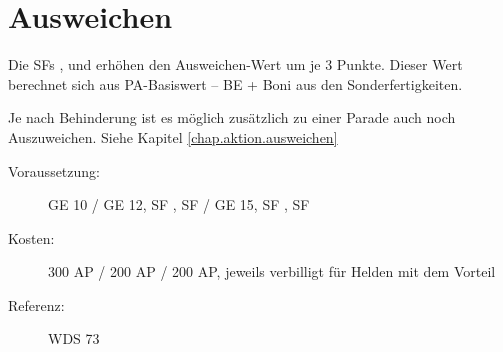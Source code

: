 \section{Ausweichen}
\label{sf.ausweichen}
Die SFs ,  und  erhöhen den Ausweichen-Wert um je 3 Punkte.
Dieser Wert berechnet sich aus PA-Basiswert – BE + Boni aus den Sonderfertigkeiten.

Je nach Behinderung ist es möglich zusätzlich zu einer Parade auch noch Auszuweichen.
Siehe Kapitel \ref{chap.aktion.ausweichen}

\begin{description}
    \item[Voraussetzung:]
        GE 10 / GE 12, SF , SF  / GE 15, SF , SF 
    \item [Kosten:]
        300 AP / 200 AP / 200 AP, jeweils verbilligt für Helden mit dem Vorteil 
    \item [Referenz:]
        WDS 73
\end{description}
